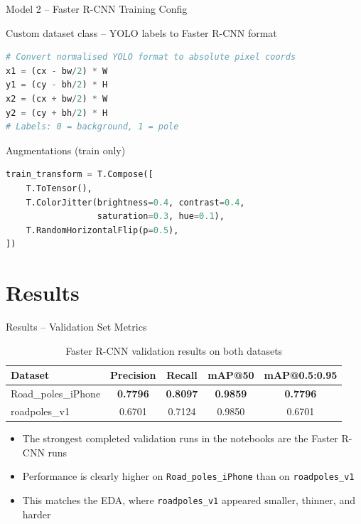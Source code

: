 \documentclass[aspectratio=169]{beamer}
\begin{document}
\begin{frame}[fragile,shrink=5]{Model 2 -- Faster R-CNN Training Config}
  \begin{block}{Custom dataset class -- YOLO labels to Faster R-CNN format}
\begin{lstlisting}[language=Python]
# Convert normalised YOLO format to absolute pixel coords
x1 = (cx - bw/2) * W
y1 = (cy - bh/2) * H
x2 = (cx + bw/2) * W
y2 = (cy + bh/2) * H
# Labels: 0 = background, 1 = pole
\end{lstlisting}
  \end{block}
  \begin{block}{Augmentations (train only)}
\begin{lstlisting}[language=Python]
train_transform = T.Compose([
    T.ToTensor(),
    T.ColorJitter(brightness=0.4, contrast=0.4,
                  saturation=0.3, hue=0.1),
    T.RandomHorizontalFlip(p=0.5),
])
\end{lstlisting}
  \end{block}
\end{frame}

\section{Results}

\begin{frame}{Results -- Validation Set Metrics}
  \begin{table}
    \centering
    \renewcommand{\arraystretch}{1.4}
    \begin{tabular}{lcccc}
      \toprule
      \textbf{Dataset} & \textbf{Precision} & \textbf{Recall} & \textbf{mAP@50} & \textbf{mAP@0.5:0.95} \\
      \midrule
      Road\_poles\_iPhone & \textbf{0.7796} & \textbf{0.8097} & \textbf{0.9859} & \textbf{0.7796} \\
      roadpoles\_v1      & 0.6701 & 0.7124 & 0.9850 & 0.6701 \\
      \bottomrule
    \end{tabular}
    \caption{Faster R-CNN validation results on both datasets}
  \end{table}
  \vspace{0.5em}
  \begin{itemize}
    \item The strongest completed validation runs in the notebooks are the Faster R-CNN runs
    \item Performance is clearly higher on \texttt{Road\_poles\_iPhone} than on \texttt{roadpoles\_v1}
    \item This matches the EDA, where \texttt{roadpoles\_v1} appeared smaller, thinner, and harder
  \end{itemize}
\end{frame}
\end{document}
